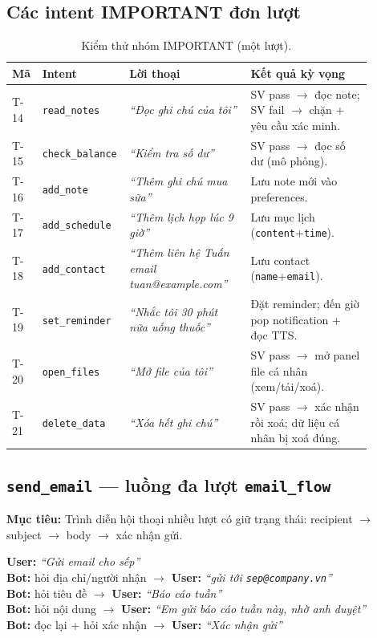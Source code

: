 \documentclass[12pt,a4paper]{article}
\newcommand{\role}[1]{\par\smallskip\noindent\textbf{\textcolor{hdr}{Mục tiêu:}} #1\par\smallskip}
\newcommand{\say}[1]{\textit{``#1''}}
\begin{document}
\subsection{Các intent IMPORTANT đơn lượt}
\begin{table}[H]
\centering\small
\caption{Kiểm thử nhóm IMPORTANT (một lượt).}
\begin{tabular}{p{0.06\linewidth}p{0.17\linewidth}p{0.33\linewidth}p{0.33\linewidth}}
\toprule
\textbf{Mã} & \textbf{Intent} & \textbf{Lời thoại} & \textbf{Kết quả kỳ vọng} \\
\midrule
T-14 & \texttt{read\_notes} & \say{Đọc ghi chú của tôi} & SV pass $\to$ đọc note; SV fail $\to$ chặn + yêu cầu xác minh. \\
T-15 & \texttt{check\_balance} & \say{Kiểm tra số dư} & SV pass $\to$ đọc số dư (mô phỏng). \\
T-16 & \texttt{add\_note} & \say{Thêm ghi chú mua sữa} & Lưu note mới vào preferences. \\
T-17 & \texttt{add\_schedule} & \say{Thêm lịch họp lúc 9 giờ} & Lưu mục lịch (\texttt{content}+\texttt{time}). \\
T-18 & \texttt{add\_contact} & \say{Thêm liên hệ Tuấn email tuan@example.com} & Lưu contact (\texttt{name}+\texttt{email}). \\
T-19 & \texttt{set\_reminder} & \say{Nhắc tôi 30 phút nữa uống thuốc} & Đặt reminder; đến giờ pop notification + đọc TTS. \\
T-20 & \texttt{open\_files} & \say{Mở file của tôi} & SV pass $\to$ mở panel file cá nhân (xem/tải/xoá). \\
T-21 & \texttt{delete\_data} & \say{Xóa hết ghi chú} & SV pass $\to$ xác nhận rồi xoá; dữ liệu cá nhân bị xoá đúng. \\
\bottomrule
\end{tabular}
\end{table}

\subsection{\texttt{send\_email} --- luồng đa lượt \texttt{email\_flow}}
\role{Trình diễn hội thoại nhiều lượt có giữ trạng thái: recipient $\to$ subject
$\to$ body $\to$ xác nhận gửi.}

\begin{scriptbox}
\textbf{User:} \say{Gửi email cho sếp} \\
\textbf{Bot:} hỏi địa chỉ/người nhận $\to$ \textbf{User:} \say{gửi tới \texttt{sep@company.vn}} \\
\textbf{Bot:} hỏi tiêu đề $\to$ \textbf{User:} \say{Báo cáo tuần} \\
\textbf{Bot:} hỏi nội dung $\to$ \textbf{User:} \say{Em gửi báo cáo tuần này, nhờ anh duyệt} \\
\textbf{Bot:} đọc lại + hỏi xác nhận $\to$ \textbf{User:} \say{Xác nhận gửi}
\end{scriptbox}
\end{document}
